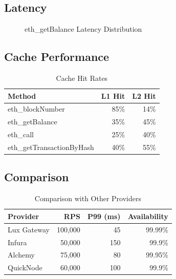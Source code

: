 \documentclass[11pt,a4paper]{article}
\begin{document}
\subsection{Latency}

\begin{figure}[htbp]
\centering
{}
\caption{eth\_getBalance Latency Distribution}
\label{fig:latency}
\end{figure}

\subsection{Cache Performance}

\begin{table}[htbp]
\centering
\caption{Cache Hit Rates}
\begin{tabular}{lrr}
\toprule
\textbf{Method} & \textbf{L1 Hit} & \textbf{L2 Hit} \\
\midrule
eth\_blockNumber & 85\% & 14\% \\
eth\_getBalance & 35\% & 45\% \\
eth\_call & 25\% & 40\% \\
eth\_getTransactionByHash & 40\% & 55\% \\
\bottomrule
\end{tabular}
\label{tab:cachehit}
\end{table}

\subsection{Comparison}

\begin{table}[htbp]
\centering
\caption{Comparison with Other Providers}
\begin{tabular}{lrrr}
\toprule
\textbf{Provider} & \textbf{RPS} & \textbf{P99 (ms)} & \textbf{Availability} \\
\midrule
Lux Gateway & 100,000 & 45 & 99.99\% \\
Infura & 50,000 & 150 & 99.9\% \\
Alchemy & 75,000 & 80 & 99.95\% \\
QuickNode & 60,000 & 100 & 99.9\% \\
\bottomrule
\end{tabular}
\label{tab:comparison}
\end{table}
\end{document}
